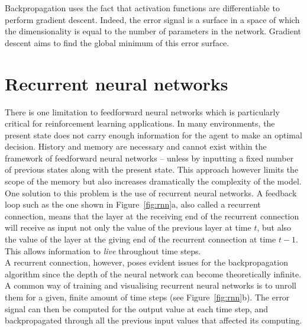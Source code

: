 Backpropagation uses the fact that activation functions are differentiable to
perform gradient descent. Indeed, the error signal is a surface in a space
of which the dimensionality is equal to the number of parameters in the
network. Gradient descent aims to find the global minimum of this error
surface.\\



\section{Recurrent neural networks}
There is one limitation to feedforward neural networks which is particularly
critical for reinforcement learning applications. In many environments, the
present state does not carry enough information for the agent to make an
optimal decision. History and memory are necessary and cannot exist within
the framework of feedforward neural networks -- unless by inputting a fixed
number of previous states along with the present state. This approach however
limits the scope of the memory but also increases dramatically the complexity
of the model.\\

One solution to this problem is the use of recurrent neural networks.
A feedback loop such as the one shown in Figure~\ref{fig:rnn}a, also called
a recurrent connection, means that the layer at the receiving end of the
recurrent connection will receive as input not only the value of the previous
layer at time $t$, but also the value of the layer at the giving end of the 
recurrent connection at time $t-1$. This allows information to \textit{live}
throughout time steps.\\

A recurrent connection, however, poses evident issues for the backpropagation
algorithm since the depth of the neural network can become theoretically
infinite.  A common way of training and visualising recurrent neural networks 
is to unroll them for a given, finite amount of time steps (see 
Figure~\ref{fig:rnn}b).  The error signal can then be computed
for the output value at each time step, and backpropagated through all the
previous input values that affected its computing.\\

